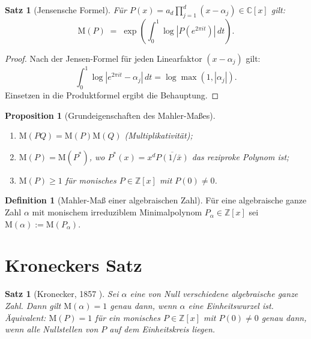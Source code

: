 \documentclass[12pt,a4paper]{amsart}
\newtheorem{proposition}[theorem]{Proposition}
\newtheorem{satz}[theorem]{Satz}
\theoremstyle{definition}
\newtheorem{definition_de}[theorem]{Definition}
\theoremstyle{remark}
\newcommand{\Z}{\mathbb{Z}}
\newcommand{\C}{\mathbb{C}}
\newcommand{\M}{\mathrm{M}}
\begin{document}
\begin{satz}[Jensensche Formel]
  Für $P(x) = a_d \prod_{j=1}^d (x - \alpha_j) \in \C[x]$ gilt:
  \[
    \M(P) \;=\; \exp\!\left(\int_0^1 \log|P(e^{2\pi i t})|\,dt\right).
  \]
\end{satz}

\begin{proof}
  Nach der Jensen-Formel für jeden Linearfaktor $(x - \alpha_j)$ gilt:
  \[
    \int_0^1 \log|e^{2\pi it} - \alpha_j|\,dt = \log\max(1, |\alpha_j|).
  \]
  Einsetzen in die Produktformel ergibt die Behauptung.
\end{proof}

\begin{proposition}[Grundeigenschaften des Mahler-Maßes]
  \begin{enumerate}[label=(\roman*)]
    \item $\M(PQ) = \M(P)\M(Q)$ (Multiplikativität);
    \item $\M(P) = \M(P^\ast)$, wo $P^\ast(x) = x^d \overline{P(1/\bar{x})}$
      das reziproke Polynom ist;
    \item $\M(P) \geq 1$ für monisches $P \in \Z[x]$ mit $P(0) \neq 0$.
  \end{enumerate}
\end{proposition}

\begin{definition_de}[Mahler-Maß einer algebraischen Zahl]
  Für eine algebraische ganze Zahl $\alpha$ mit monischem irreduziblem
  Minimalpolynom $P_\alpha \in \Z[x]$ sei $\M(\alpha) := \M(P_\alpha)$.
\end{definition_de}

\section{Kroneckers Satz}\label{sec:kronecker}

\begin{satz}[Kronecker, 1857 \cite{Kronecker1857}]\label{satz:kronecker}
  Sei $\alpha$ eine von Null verschiedene algebraische ganze Zahl.
  Dann gilt $\M(\alpha) = 1$ genau dann, wenn $\alpha$ eine Einheitswurzel ist.
  Äquivalent: $\M(P) = 1$ für ein monisches $P \in \Z[x]$ mit $P(0) \neq 0$ genau dann,
  wenn alle Nullstellen von $P$ auf dem Einheitskreis liegen.
\end{satz}
\end{document}
